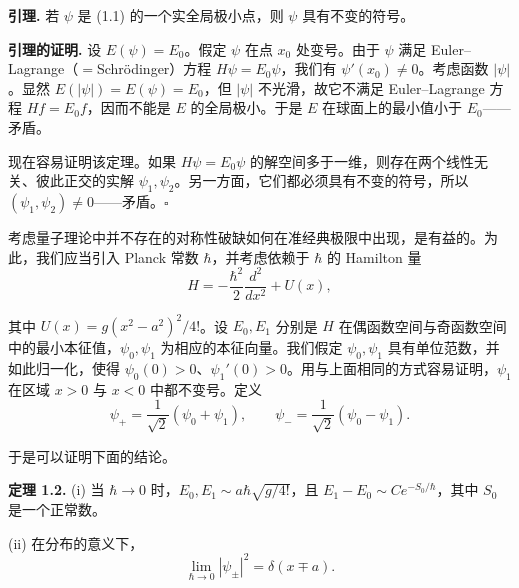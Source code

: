 \textbf{引理.}
若 $\psi$ 是 (1.1) 的一个实全局极小点，则 $\psi$ 具有不变的符号。

\textbf{引理的证明.}
设 $E(\psi)=E_0$。假定 $\psi$ 在点 $x_0$ 处变号。由于 $\psi$ 满足 Euler–Lagrange（$=$Schrödinger）方程 $H\psi=E_0\psi$，我们有 $\psi'(x_0)\neq0$。考虑函数 $|\psi|$。显然 $E(|\psi|)=E(\psi)=E_0$，但 $|\psi|$ 不光滑，故它不满足 Euler–Lagrange 方程 $Hf=E_0f$，因而不能是 $E$ 的全局极小。于是 $E$ 在球面上的最小值小于 $E_0$——矛盾。

现在容易证明该定理。如果 $H\psi=E_0\psi$ 的解空间多于一维，则存在两个线性无关、彼此正交的实解 $\psi_1,\psi_2$。另一方面，它们都必须具有不变的符号，所以 $(\psi_1,\psi_2)\neq0$——矛盾。$\square$


考虑量子理论中并不存在的对称性破缺如何在准经典极限中出现，是有益的。为此，我们应当引入 Planck 常数 $\hbar$，并考虑依赖于 $\hbar$ 的 Hamilton 量
\begin{equation}
  \tag{1.2}
  \label{eq:1-2}
  H=-\frac{\hbar^2}{2}\frac{d^2}{dx^2}+U(x),
\end{equation}

其中 $U(x)=g(x^2-a^2)^2/4!$。设 $E_0,E_1$ 分别是 $H$ 在偶函数空间与奇函数空间中的最小本征值，$\psi_0,\psi_1$ 为相应的本征向量。我们假定 $\psi_0,\psi_1$ 具有单位范数，并如此归一化，使得 $\psi_0(0)>0$、$\psi_1'(0)>0$。用与上面相同的方式容易证明，$\psi_1$ 在区域 $x>0$ 与 $x<0$ 中都不变号。定义
\[
\psi_+=\frac{1}{\sqrt2}(\psi_0+\psi_1),\qquad \psi_-=\frac{1}{\sqrt2}(\psi_0-\psi_1).
\]

于是可以证明下面的结论。

\textbf{定理 1.2.}
(i) 当 $\hbar\to0$ 时，$E_0,E_1\sim a\hbar\sqrt{g/4!}$，且 $E_1-E_0\sim Ce^{-S_0/\hbar}$，其中 $S_0$ 是一个正常数。

(ii) 在分布的意义下，
\begin{equation}
  \tag{1.3}
  \label{eq:1-3}
  \lim_{\hbar\to0}|\psi_\pm|^2=\delta(x\mp a).
\end{equation}

